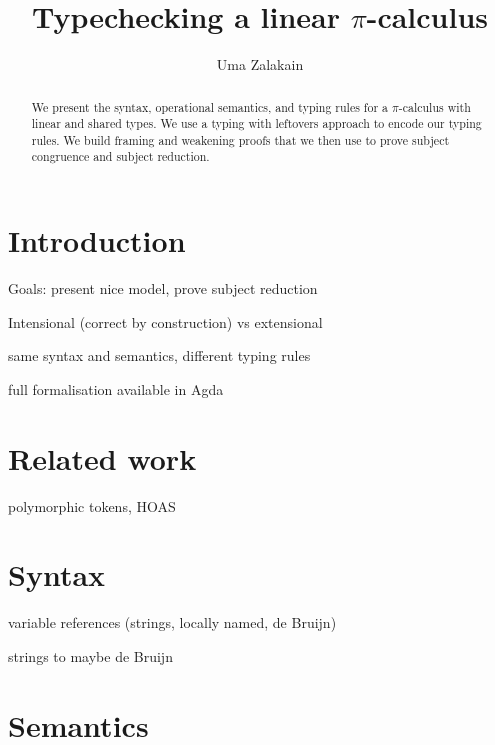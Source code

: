 \documentclass{scrartcl}
\newcommand{\picalc}{$\pi$-calculus}
\begin{document}
\title{Typechecking a linear \picalc}
\author{Uma Zalakain}
\maketitle

\begin{abstract}
  We present the syntax, operational semantics, and typing rules for a \picalc{} with linear and shared types. We use a typing with leftovers approach \cite{} to encode our typing rules. We build framing and weakening proofs that we then use to prove subject congruence and subject reduction.
\end{abstract}

\section{Introduction}

Goals: present nice model, prove subject reduction

Intensional (correct by construction) vs extensional

same syntax and semantics, different typing rules

full formalisation available in Agda

\section{Related work}

\cite{previous-work} polymorphic tokens, HOAS

\cite{typing-with-leftovers}

\section{Syntax}

variable references (strings, locally named, de Bruijn)

strings to maybe de Bruijn

\section{Semantics}
\end{document}
